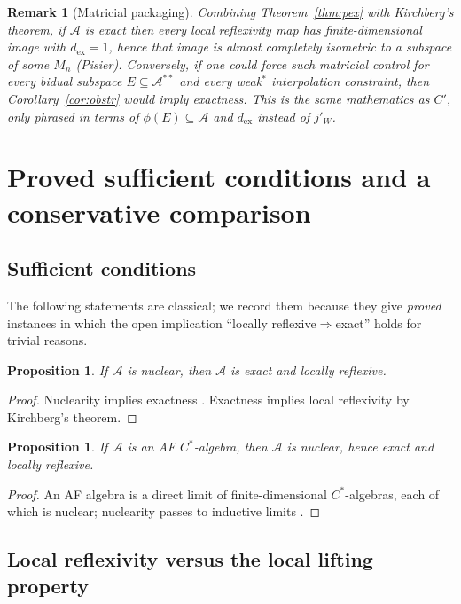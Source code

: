 \documentclass[12pt]{article}
\newtheorem{proposition}[theorem]{Proposition}
\newtheorem{remark}[theorem]{Remark}
\newcommand{\A}{\mathcal A}
\newcommand{\dex}{d_{\mathrm{ex}}}
\newcommand{\Mn}{M_n}
\begin{document}
\begin{remark}[Matricial packaging]\label{rem:mlr}
Combining Theorem~\ref{thm:pex} with Kirchberg's theorem, if $\A$ is exact then every local reflexivity map has finite-dimensional image with $\dex=1$, hence that image is almost completely isometric to a subspace of some $\Mn$ (Pisier).  Conversely, if one could force such matricial control for \emph{every} bidual subspace $E\subseteq\A^{**}$ and every weak$^*$ interpolation constraint, then Corollary~\ref{cor:obstr} would imply exactness.  This is the same mathematics as $C'$, only phrased in terms of $\phi(E)\subseteq\A$ and $\dex$ instead of $j'_W$.
\end{remark}

\section{Proved sufficient conditions and a conservative comparison}

\subsection{Sufficient conditions}

The following statements are classical; we record them because they give \emph{proved} instances in which the open implication ``locally reflexive$\Rightarrow$exact'' holds for trivial reasons.

\begin{proposition}\label{prop:nuclear}
If $\A$ is nuclear, then $\A$ is exact and locally reflexive.
\end{proposition}

\begin{proof}
Nuclearity implies exactness \cite[Ch.~2]{BO}.  Exactness implies local reflexivity by Kirchberg's theorem.
\end{proof}

\begin{proposition}\label{prop:af}
If $\A$ is an AF $C^*$-algebra, then $\A$ is nuclear, hence exact and locally reflexive.
\end{proposition}

\begin{proof}
An AF algebra is a direct limit of finite-dimensional $C^*$-algebras, each of which is nuclear; nuclearity passes to inductive limits \cite{BO}.
\end{proof}

\subsection{Local reflexivity versus the local lifting property}
\end{document}
